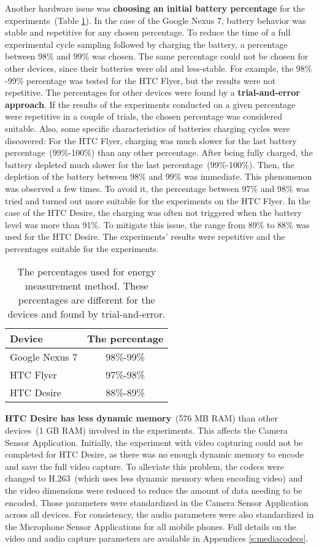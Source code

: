Another hardware issue was \textbf{choosing an initial battery percentage} for the experiments\ (Table \ref{table:differentpercentage}). In the case of the Google Nexus 7, battery behavior was stable and repetitive for any chosen percentage. To reduce the time of a full experimental cycle sampling followed by charging the battery, a percentage between 98\% and 99\% was chosen. The same percentage could not be chosen for other devices, since their batteries were old and less-stable. For example, the 98\% -99\% percentage was tested for the HTC Flyer, but the results were not repetitive. The percentages for other devices were found by a \textbf{trial-and-error approach}. If the results of the experiments conducted on a given percentage were repetitive in a couple of trials, the chosen percentage was considered suitable. Also, some specific characteristics of batteries charging cycles were discovered: For the HTC Flyer, charging was much slower for the last battery percentage\ (99\%-100\%) than any other percentage. After being fully charged, the battery depleted much slower for the last percentage\ (99\%-100\%). Then, the depletion of the battery between 98\% and 99\% was immediate. This phenomenon was observed a few times. To avoid it, the percentage between 97\% and 98\% was tried and turned out more suitable for the experiments on the HTC Flyer. In the case of the HTC Desire, the charging was often not triggered when the battery level was more than 91\%. To mitigate this issue, the range from 89\% to 88\% was used for the HTC Desire. The experiments' results were repetitive and the percentages suitable for the experiments. 

\begin{table}[H]
\centering
    \begin{tabular}{| l | c |}
    \hline
    	Device & The percentage \\ \hline
    	Google Nexus 7 & 98\%-99\% \\ \hline
    	HTC Flyer & 97\%-98\% \\ \hline
    	HTC Desire & 88\%-89\% \\ \hline
    \end{tabular}
    \caption{The percentages used for energy measurement method. These percentages are different for the devices and found by trial-and-error.}
	\label{table:differentpercentage}
\end{table}

\textbf{HTC Desire has less dynamic memory}\ (576 MB RAM) than other devices\ (1 GB RAM) involved in the experiments. This affects the Camera Sensor Application. Initially, the experiment with video capturing could not be completed for HTC Desire, as there was no enough dynamic memory to encode and save the full video capture.  To alleviate this problem, the codecs were changed to H.263\ (which uses less dynamic memory when encoding video) and the video dimensions were reduced to reduce the amount of data needing to be encoded. Those parameters were standardized in the Camera Sensor Application across all devices. For consistency, the audio parameters were also standardized in the Microphone Sensor Applications for all mobile phones. Full details on the video and audio capture parameters are available in Appendices \ref{s:mediacodecs}.
			
